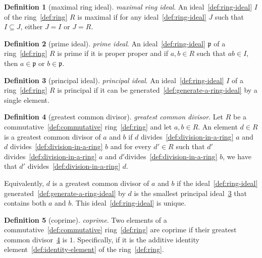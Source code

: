 \documentclass[12pt,a4paper]{article}
\theoremstyle{definition}
\newtheorem{definition}{Definition}
\begin{document}
\begin{definition}[maximal ring ideal]\label{def:maximal-ring-ideal}
\emph{maximal ring ideal}. An ideal~\ref{def:ring-ideal} $I$ of the ring~\ref{def:ring} $R$ is maximal if for any ideal~\ref{def:ring-ideal} $J$ such that $I\subseteq J$, either $J=I$ or $J=R$.
\end{definition}

\begin{definition}[prime ideal]\label{def:prime-ideal}
\emph{prime ideal}. An ideal~\ref{def:ring-ideal} $\mathfrak p$ of a ring~\ref{def:ring} $R$ is prime if it is proper proper and if $a,b\in R$ such that $ab \in I$, then $a\in \mathfrak p$ or $b\in \mathfrak p$.
\end{definition}

\begin{definition}[principal ideal]\label{def:principal-ideal}
\emph{principal ideal}. An ideal~\ref{def:ring-ideal} $I$ of a ring~\ref{def:ring} $R$ is principal if it can be generated~\ref{def:generate-a-ring-ideal} by a single element.
\end{definition}

\begin{definition}[greatest common divisor]\label{def:greatest-common-divisor}
\emph{greatest common divisor}. Let $R$ be a commutative~\ref{def:commutative} ring~\ref{def:ring} and let $a,b\in R$. An element $d\in R$ is a greatest common divisor of $a$ and $b$ if $d$ divides~\ref{def:division-in-a-ring} $a$ and $d$ divides~\ref{def:division-in-a-ring} $b$ and for every $d'\in R$ such that $d'$ divides~\ref{def:division-in-a-ring} $a$ and $d'$divides~\ref{def:division-in-a-ring} $b$, we have that $d'$ divides~\ref{def:division-in-a-ring} $d$. 

Equivalently, $d$ is a greatest common divisor of $a$ and $b$ if the ideal~\ref{def:ring-ideal} generated~\ref{def:generate-a-ring-ideal} by $d$ is the smallest principal ideal~\ref{def:principal-ideal} that contains both $a$ and $b$. This ideal~\ref{def:ring-ideal} is unique.
\end{definition}

\begin{definition}[coprime]\label{def:coprime}
\emph{coprime}. Two elements of a commutative~\ref{def:commutative} ring~\ref{def:ring} are coprime if their  greatest common divisor~\ref{def:greatest-common-divisor} is $1$. Specifically, if it is the additive identity element~\ref{def:identity-element} of the ring~\ref{def:ring}.
\end{definition}
\end{document}
